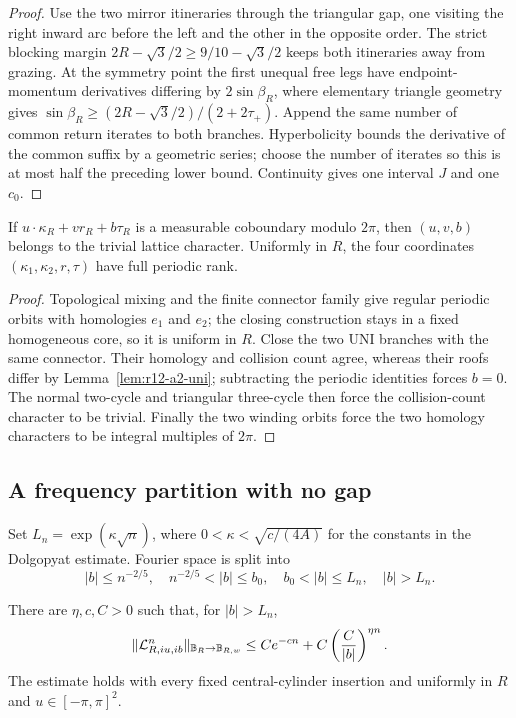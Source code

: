 \begin{proof}
Use the two mirror itineraries through the triangular gap, one visiting the
right inward arc before the left and the other in the opposite order.  The
strict blocking margin
$2R-\sqrt3/2\ge9/10-\sqrt3/2$ keeps both itineraries away from grazing.  At
the symmetry point the first unequal free legs have endpoint-momentum
derivatives differing by $2\sin\beta_R$, where elementary triangle geometry
gives
$\sin\beta_R\ge(2R-\sqrt3/2)/(2+2\tau_+)$.  Append the same number of common
return iterates to both branches.  Hyperbolicity bounds the derivative of the
common suffix by a geometric series; choose the number of iterates so this is
at most half the preceding lower bound.  Continuity gives one interval $J$
and one $c_0$.
\end{proof}

\begin{theorem}
\label{thm:r12-a2-arithmetic}
If
$u\cdot\kappa_R+v r_R+b\tau_R$ is a measurable coboundary modulo $2\pi$,
then $(u,v,b)$ belongs to the trivial lattice character.  Uniformly in $R$,
the four coordinates $(\kappa_1,\kappa_2,r,\tau)$ have full periodic rank.
\end{theorem}

\begin{proof}
Topological mixing and the finite connector family give regular periodic
orbits with homologies $e_1$ and $e_2$; the closing construction stays in a
fixed homogeneous core, so it is uniform in $R$.  Close the two UNI branches
with the same connector.  Their homology and collision count agree, whereas
their roofs differ by Lemma~\ref{lem:r12-a2-uni}; subtracting the periodic
identities forces $b=0$.  The normal two-cycle and triangular three-cycle then
force the collision-count character to be trivial.  Finally the two winding
orbits force the two homology characters to be integral multiples of
$2\pi$.
\end{proof}

\subsection{A frequency partition with no gap}

Set $L_n=\exp(\kappa\sqrt n)$, where
$0<\kappa<\sqrt{c/(4A)}$ for the constants in the Dolgopyat estimate.  Fourier
space is split into
\[
 |b|\le n^{-2/5},\quad
 n^{-2/5}<|b|\le b_0,\quad
 b_0<|b|\le L_n,\quad
 |b|>L_n.
\]

\begin{lemma}
\label{lem:r12-a2-multiblock}
There are $\eta,c,C>0$ such that, for $|b|>L_n$,
\[
 \|\mathcal L_{R,iu,ib}^{n}\|_{\mathbb B_R\to\mathbb B_{R,w}}
 \le Ce^{-cn}+C\left({C\over |b|}\right)^{\eta n}.
\]
The estimate holds with every fixed central-cylinder insertion and uniformly
in $R$ and $u\in[-\pi,\pi]^2$.
\end{lemma}

